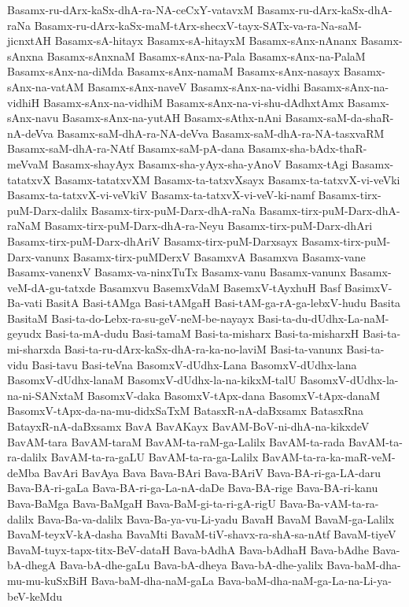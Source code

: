 {Basamx-ru-dArx-kaSx-dhA-ra-NA-ceCxY-vatavxM
Basamx-ru-dArx-kaSx-dhA-raNa
Basamx-ru-dArx-kaSx-maM-tArx-shecxV-tayx-SATx-va-ra-Na-saM-jicnxtAH
Basamx-sA-hitayx
Basamx-sA-hitayxM
Basamx-sAnx-nAnanx
Basamx-sAnxna
Basamx-sAnxnaM
Basamx-sAnx-na-Pala
Basamx-sAnx-na-PalaM
Basamx-sAnx-na-diMda
Basamx-sAnx-namaM
Basamx-sAnx-nasayx
Basamx-sAnx-na-vatAM
Basamx-sAnx-naveV
Basamx-sAnx-na-vidhi
Basamx-sAnx-na-vidhiH
Basamx-sAnx-na-vidhiM
Basamx-sAnx-na-vi-shu-dAdhxtAmx
Basamx-sAnx-navu
Basamx-sAnx-na-yutAH
Basamx-sAthx-nAni
Basamx-saM-da-shaR-nA-deVva
Basamx-saM-dhA-ra-NA-deVva
Basamx-saM-dhA-ra-NA-tasxvaRM
Basamx-saM-dhA-ra-NAtf
Basamx-saM-pA-dana
Basamx-sha-bAdx-thaR-meVvaM
Basamx-shayAyx
Basamx-sha-yAyx-sha-yAnoV
Basamx-tAgi
Basamx-tatatxvX
Basamx-tatatxvXM
Basamx-ta-tatxvXsayx
Basamx-ta-tatxvX-vi-veVki
Basamx-ta-tatxvX-vi-veVkiV
Basamx-ta-tatxvX-vi-veV-ki-namf
Basamx-tirx-puM-Darx-dalilx
Basamx-tirx-puM-Darx-dhA-raNa
Basamx-tirx-puM-Darx-dhA-raNaM
Basamx-tirx-puM-Darx-dhA-ra-Neyu
Basamx-tirx-puM-Darx-dhAri
Basamx-tirx-puM-Darx-dhAriV
Basamx-tirx-puM-Darxsayx
Basamx-tirx-puM-Darx-vanunx
Basamx-tirx-puMDerxV
BasamxvA
Basamxva
Basamx-vane
Basamx-vanenxV
Basamx-va-ninxTuTx
Basamx-vanu
Basamx-vanunx
Basamx-veM-dA-gu-tatxde
Basamxvu
BasemxVdaM
BasemxV-tAyxhuH
Basf
BasimxV-Ba-vati
BasitA
Basi-tAMga
Basi-tAMgaH
Basi-tAM-ga-rA-ga-lebxV-hudu
Basita
BasitaM
Basi-ta-do-Lebx-ra-su-geV-neM-be-nayayx
Basi-ta-du-dUdhx-La-naM-geyudx
Basi-ta-mA-dudu
Basi-tamaM
Basi-ta-misharx
Basi-ta-misharxH
Basi-ta-mi-sharxda
Basi-ta-ru-dArx-kaSx-dhA-ra-ka-no-laviM
Basi-ta-vanunx
Basi-ta-vidu
Basi-tavu
Basi-teVna
BasomxV-dUdhx-Lana
BasomxV-dUdhx-lana
BasomxV-dUdhx-lanaM
BasomxV-dUdhx-la-na-kikxM-talU
BasomxV-dUdhx-la-na-ni-SANxtaM
BasomxV-daka
BasomxV-tApx-dana
BasomxV-tApx-danaM
BasomxV-tApx-da-na-mu-didxSaTxM
BatasxR-nA-daBxsamx
BatasxRna
BatayxR-nA-daBxsamx
BavA
BavAKayx
BavAM-BoV-ni-dhA-na-kikxdeV
BavAM-tara
BavAM-taraM
BavAM-ta-raM-ga-Lalilx
BavAM-ta-rada
BavAM-ta-ra-dalilx
BavAM-ta-ra-gaLU
BavAM-ta-ra-ga-Lalilx
BavAM-ta-ra-ka-maR-veM-deMba
BavAri
BavAya
Bava
Bava-BAri
Bava-BAriV
Bava-BA-ri-ga-LA-daru
Bava-BA-ri-gaLa
Bava-BA-ri-ga-La-nA-daDe
Bava-BA-rige
Bava-BA-ri-kanu
Bava-BaMga
Bava-BaMgaH
Bava-BaM-gi-ta-ri-gA-rigU
Bava-Ba-vAM-ta-ra-dalilx
Bava-Ba-va-dalilx
Bava-Ba-ya-vu-Li-yadu
BavaH
BavaM
BavaM-ga-Lalilx
BavaM-teyxV-kA-dasha
BavaMti
BavaM-tiV-shavx-ra-shA-sa-nAtf
BavaM-tiyeV
BavaM-tuyx-tapx-titx-BeV-dataH
Bava-bAdhA
Bava-bAdhaH
Bava-bAdhe
Bava-bA-dhegA
Bava-bA-dhe-gaLu
Bava-bA-dheya
Bava-bA-dhe-yalilx
Bava-baM-dha-mu-mu-kuSxBiH
Bava-baM-dha-naM-gaLa
Bava-baM-dha-naM-ga-La-na-Li-ya-beV-keMdu
}
